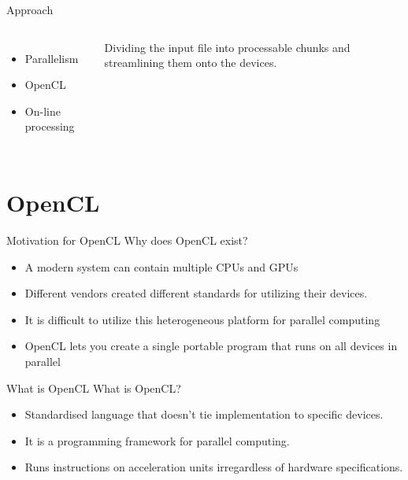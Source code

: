 \documentclass[10pt,aspectratio=169]{beamer} %
\newcommand{\hide}[1] {
	\textcolor{hiddencolor}{#1}
}
\begin{document}
\begin{frame}{Approach}


\begin{columns}[onlytextwidth]
\column{\dimexpr\linewidth-90mm-5mm}
\begin{itemize}
\item \hide{Parallelism}
\item \hide{OpenCL}
\item \alert{On-line processing}
\end{itemize}

\column{90mm}
\large
Dividing the input file into processable chunks and streamlining them onto the devices.
\end{columns}

\end{frame}



\section{OpenCL}

\begin{frame}{Motivation for OpenCL}
Why does OpenCL exist?
\begin{itemize}
\item A modern system can contain multiple CPUs and GPUs
\item Different vendors created different standards for utilizing their devices.
\item It is difficult to utilize this heterogeneous platform for parallel computing
\item OpenCL lets you create a single portable program that runs on all devices in parallel
\end{itemize}
  
\end{frame}

\begin{frame}{What is OpenCL}
What is OpenCL?
\begin{itemize}
\item Standardised language that doesn't tie implementation to specific devices. 
\item It is a programming framework for parallel computing.
\item Runs instructions on acceleration units irregardless of hardware specifications.
\end{itemize}
  
\end{frame}
\end{document}
